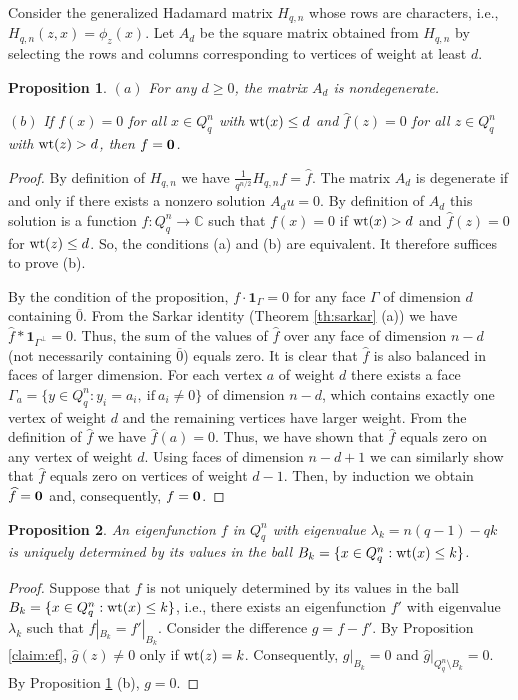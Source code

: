 \documentclass[11pt]{article}
\newtheorem{claim}{Proposition}[section]
\theoremstyle{definition}
\newcommand{\wt}{{\rm wt}}
\begin{document}
{{{Consider the generalized Hadamard matrix $H_{q,n}$ whose rows are characters, i.e., $H_{q,n}(z,x)=\phi_z(x)$.  Let  $A_d$  be the square matrix obtained from $H_{q,n}$ by selecting the rows and columns corresponding to vertices of weight at least $d$.

\begin{claim}\label{c:doplinearball}
$(a)$ For any $d\geq 0$, the matrix $A_d$ is nondegenerate.

$(b)$ If $f(x)=0$ for all $x\in Q^n_q$ with $\wt(x)\leq d$ and $\widehat{f}(z)=0$ for all $z\in Q^n_q$ with $\wt(z)> d$, then $f={\bf 0}$.
\end{claim}
\begin{proof}
By  definition of $H_{q,n}$ we have  $\frac{1}{q^{n/2}}H_{q,n}f= \widehat{f}$.
The matrix $A_d$ is degenerate if and only if there exists a nonzero solution $A_du=0$. By definition of $A_d$ this solution is a function $f:Q_q^n\rightarrow\mathbb{C}$ such that $f(x)=0$ if $\wt(x)>d$ and $\widehat{f}(z)=0$ for $\wt(z)\leq d$.
So, the  conditions (a) and (b)  are equivalent. It therefore suffices to prove (b).


By the  condition of the proposition, $f\cdot{\mathbf 1}_{\Gamma}=0$ for any face $\Gamma$ of dimension $d$ containing $\bar{0}$. From the Sarkar identity (Theorem \ref{th:sarkar} (a)) we have \\
$\widehat{f}*{\mathbf 1}_{\Gamma^\perp}=0$. Thus,  the sum of the values of $\widehat{f}$ over any face of dimension $n-d$ (not necessarily containing $\bar{0}$) equals zero. It is clear that $\widehat{f}$ is also balanced in faces of larger dimension. For each vertex $a$ of weight $d$ there exists a face $\Gamma_a=\{y\in Q^n_q : y_i=a_i,\ \text{if}\ a_i\neq 0\}$ of dimension $n-d$, which contains exactly one vertex of weight $d$ and the remaining vertices have larger weight. From the definition of $\widehat{f}$ we have $\widehat{f}(a)=0$. Thus, we have shown that $\widehat{f}$ equals zero on any vertex of weight $d$. Using faces of dimension $n-d+1$ we can similarly show that $\widehat{f}$ equals zero on vertices of weight $d-1$. Then, by induction we obtain $\widehat{f}={\bf 0}$ and, consequently,   ${f}={\bf 0}$. 
\end{proof}

\begin{claim}\label{c:doplinearball2}
An eigenfunction $f$ in $Q^n_q$ with eigenvalue $\lambda_k=n(q-1)-qk$ is uniquely determined by its values in the ball $B_k=\{x\in Q_q^n : \wt(x)\leq k\}$.
\end{claim}
\begin{proof}
Suppose that $f$ is not uniquely determined by its values in the ball $B_k=\{x\in Q_q^n : \wt(x)\leq k\}$, i.e., there exists an eigenfunction $f'$ with eigenvalue $\lambda_k$ such that $f|_{B_k}=f'|_{B_k}$. Consider the difference $g=f-f'$. By Proposition \ref{claim:ef}, $\widehat{g}(z)\neq 0$ only if $\wt(z)=k$. Consequently, $g|_{B_k}=0$ and $\widehat{g}|_{Q^n_q\setminus B_k}=0$. By Proposition \ref{c:doplinearball} (b), $g=0$.
\end{proof}

}}}
\end{document}
